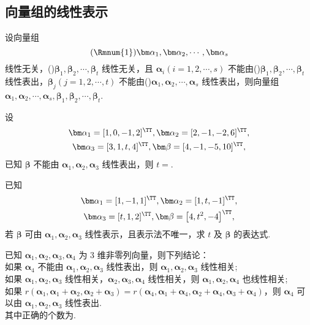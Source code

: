 \subsection{向量组的线性表示}

	\begin{titwo}
		设向量组
		\[
			(\text{\Rmnum{1}})\bm \alpha_{1}, \bm \alpha_{2}, \cdots, \bm \alpha_{s}
		\]
		线性无关，()$\bm \beta_{1}, \bm \beta_{2}, \cdots, \bm \beta_{t}$ 线性无关，且 $\bm \alpha_{i}(i = 1,2,\cdots,s)$ 不能由()$\bm \beta_{1}, \bm \beta_{2}, \cdots, \bm \beta_{t}$ 线性表出，$\bm \beta_{j}(j = 1,2,\cdots,t)$ 不能由()$\bm \alpha_{1}, \bm \alpha_{2}, \cdots, \bm \alpha_{s}$ 线性表出，则向量组 $\bm \alpha_{1}, \bm \alpha_{2}, \cdots, \bm \alpha_{s}, \bm \beta_{1}, \bm \beta_{2}, \cdots, \bm \beta_{t}$\kuo.

	\end{titwo}

	\begin{titwo}
		设
		\begin{gather*}
			\bm \alpha_{1} = [1,0,-1,2]^{\TT}, \bm \alpha_{2} = [2,-1,-2,6]^{\TT},\\
			\bm \alpha_{3} = [3,1,t,4]^{\TT}, \bm \beta = [4,-1,-5,10]^{\TT},
		\end{gather*}
		已知 $\bm \beta$ 不能由 $\bm \alpha_{1}, \bm \alpha_{2}, \bm \alpha_{3}$ 线性表出，则 $t = $\htwo.
	\end{titwo}

	\begin{titwo}
		已知
		\begin{gather*}
			\bm \alpha_{1} = [1,-1,1]^{\TT},\bm \alpha_{2} = [1,t,-1]^{\TT},\\
			\bm \alpha_{3} = [t,1,2]^{\TT},\bm \beta = \bigl[4,t^{2},-4\bigr]^{\TT},
		\end{gather*}
		若 $\bm \beta$ 可由 $\bm \alpha_{1},\bm \alpha_{2},\bm \alpha_{3}$ 线性表示，且表示法不唯一，求 $t$ 及 $\bm \beta$ 的表达式.
	\end{titwo}

	\begin{titwo}
		已知 $\bm \alpha_{1},\bm \alpha_{2},\bm \alpha_{3},\bm \alpha_{4}$ 为 $3$ 维非零列向量，则下列结论：\\
		如果 $\bm \alpha_{4}$ 不能由 $\bm \alpha_{1},\bm \alpha_{2},\bm \alpha_{3}$ 线性表出，则 $\bm \alpha_{1},\bm \alpha_{2},\bm \alpha_{3}$ 线性相关;\\
		如果 $\bm \alpha_{1},\bm \alpha_{2},\bm \alpha_{3}$ 线性相关，$\bm \alpha_{2},\bm \alpha_{3},\bm \alpha_{4}$ 线性相关，则 $\bm \alpha_{1},\bm \alpha_{2},\bm \alpha_{4}$ 也线性相关;\\
		如果 $r(\bm \alpha_{1}, \bm \alpha_{1} + \bm \alpha_{2}, \bm \alpha_{2} + \bm \alpha_{3}) = r(\bm \alpha_{4}, \bm \alpha_{1} + \bm \alpha_{4}, \bm \alpha_{2} + \bm \alpha_{4}, \bm \alpha_{3} + \bm \alpha_{4})$，则 $\bm \alpha_{4}$ 可以由 $\bm \alpha_{1},\bm \alpha_{2},\bm \alpha_{3}$ 线性表出.\\
		其中正确的个数为\kuo.

		\fourch{$0$}{$1$}{$2$}{$3$}
	\end{titwo}

